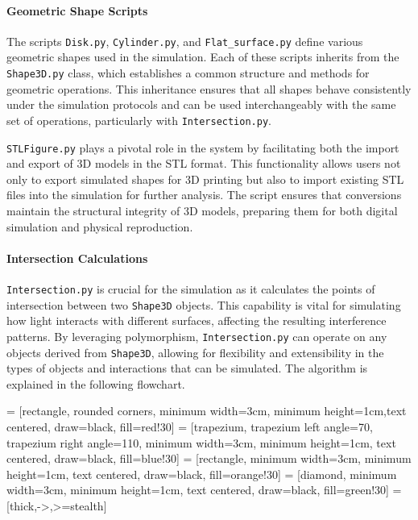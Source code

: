 \documentclass[../main.tex]{subfiles}
\begin{document}
\paragraph{Geometric Shape Scripts}
The scripts \texttt{Disk.py}, \texttt{Cylinder.py}, and \texttt{Flat\_surface.py} define various geometric shapes used in the simulation. Each of these scripts inherits from the \texttt{Shape3D.py} class, which establishes a common structure and methods for geometric operations. This inheritance ensures that all shapes behave consistently under the simulation protocols and can be used interchangeably with the same set of operations, particularly with \texttt{Intersection.py}.

\texttt{STLFigure.py} plays a pivotal role in the system by facilitating both the import and export of 3D models in the STL format. This functionality allows users not only to export simulated shapes for 3D printing but also to import existing STL files into the simulation for further analysis. The script ensures that conversions maintain the structural integrity of 3D models, preparing them for both digital simulation and physical reproduction.

\paragraph{Intersection Calculations}
\texttt{Intersection.py} is crucial for the simulation as it calculates the points of intersection between two \texttt{Shape3D} objects. This capability is vital for simulating how light interacts with different surfaces, affecting the resulting interference patterns. By leveraging polymorphism, \texttt{Intersection.py} can operate on any objects derived from \texttt{Shape3D}, allowing for flexibility and extensibility in the types of objects and interactions that can be simulated. The algorithm is explained in the following flowchart.

 = [rectangle, rounded corners, minimum width=3cm, minimum height=1cm,text centered, draw=black, fill=red!30]
 = [trapezium, trapezium left angle=70, trapezium right angle=110, minimum width=3cm, minimum height=1cm, text centered, draw=black, fill=blue!30]
 = [rectangle, minimum width=3cm, minimum height=1cm, text centered, draw=black, fill=orange!30]
 = [diamond, minimum width=3cm, minimum height=1cm, text centered, draw=black, fill=green!30]
 = [thick,->,>=stealth]
\end{document}
